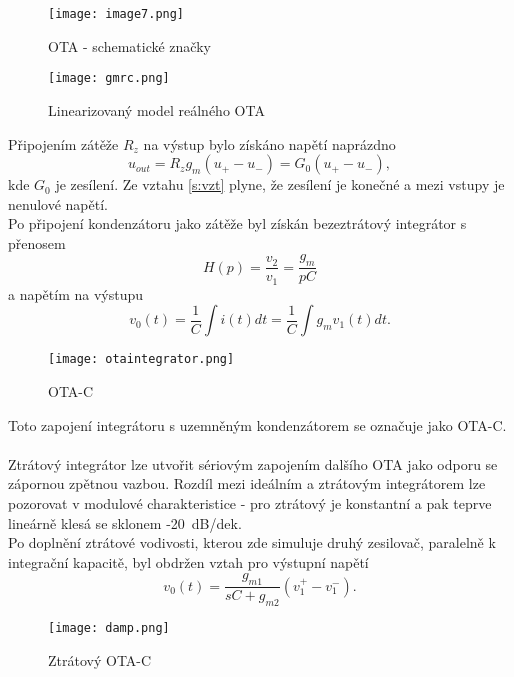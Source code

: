 \begin{figure}[h]
\centering
\texttt{[image: image7.png]}
\caption[OTA - schematické značky]{OTA - schematické značky \cite{11}}
\end{figure}
\begin{figure}[h]
\centering
\texttt{[image: gmrc.png]}
\caption[Linearizovaný model reálného OTA]{Linearizovaný model reálného OTA \cite{12}}
\end{figure}
\noindent Připojením zátěže $R_z$ na výstup bylo získáno napětí naprázdno
\begin{equation}\label{s:vzt}
u_{out} = R_zg_m(u_+ - u_-) = G_0(u_+ - u_-),
\end{equation}
kde $G_0$ je zesílení. Ze vztahu \ref{s:vzt} plyne, že zesílení je konečné a mezi vstupy je nenulové napětí. \\
\noindent Po připojení kondenzátoru jako zátěže byl získán bezeztrátový integrátor s přenosem
\begin{equation}
H(p) = \frac{v_2}{v_1} = \frac{g_m}{pC}
\end{equation}
\noindent a napětím na výstupu
\begin{equation}
v_0(t) = \frac{1}{C}\int i(t)dt = \frac{1}{C}\int g_mv_1(t)dt.
\end{equation}
\begin{figure}[h]
\centering
\texttt{[image: otaintegrator.png]}
\caption[OTA-C]{OTA-C \cite{12} \label{s:GM-C}}
\end{figure}
\noindent Toto zapojení integrátoru s uzemněným kondenzátorem se označuje jako OTA-C.\\
\\
Ztrátový integrátor lze utvořit sériovým zapojením dalšího OTA jako odporu se zápornou zpětnou vazbou. Rozdíl mezi ideálním a ztrátovým integrátorem lze pozorovat v modulové charakteristice - pro ztrátový je konstantní a pak teprve lineárně klesá se sklonem -20~dB/dek.\\
Po doplnění ztrátové vodivosti, kterou zde simuluje druhý zesilovač, paralelně k integrační kapacitě, byl obdržen vztah pro výstupní napětí
\begin{equation}
v_0(t) = \frac{g_{m1}}{sC + g_{m2}}(v_1^+ - v_{1}^-).\label{s:OTA-INT1}
\end{equation}
\begin{figure}[h]
\centering
\texttt{[image: damp.png]}
\caption[Ztrátový OTA-C]{Ztrátový OTA-C \cite{12} \label{s:OTA-INT}}
\end{figure}
